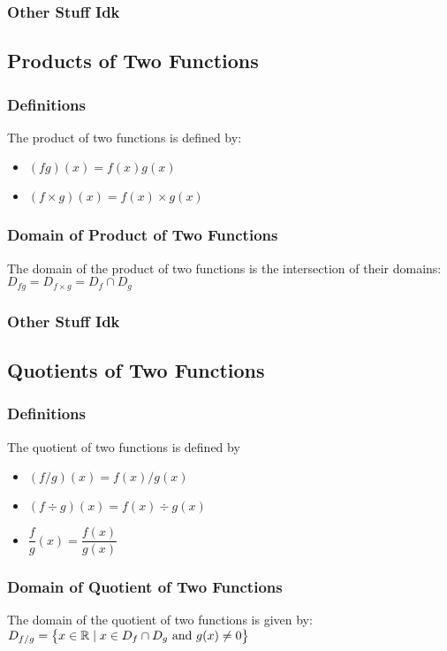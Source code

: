 \documentclass{article}
\begin{document}
	\subsubsection{Other Stuff Idk}
	\subsection{Products of Two Functions}
	\subsubsection{Definitions}
	The product of two functions is defined by:
	\begin{itemize}
		\item $(fg)(x)=f(x)g(x)$
		\item $(f\times g)(x)=f(x)\times g(x)$
	\end{itemize}
	\subsubsection{Domain of Product of Two Functions}
	The domain of the product of two functions is the intersection of their domains: $D_{fg}=D_{f\times g}=D_f\cap D_g$
	\subsubsection{Other Stuff Idk}
	\subsection{Quotients of Two Functions}
	\subsubsection{Definitions}
	The quotient of two functions is defined by
	\begin{itemize}
		\item $(f/g)(x)=f(x)/g(x)$
		\item $(f\div g)(x)=f(x)\div g(x)$
		\item $\dfrac{f}{g}(x)=\dfrac{f(x)}{g(x)}$
	\end{itemize}
	\subsubsection{Domain of Quotient of Two Functions}
	The domain of the quotient of two functions is given by: $D_{f/g}=\set{x\in\mathbb{R}\mid x\in D_f\cap D_g\text{ and }g(x)\neq0}$
\end{document}
